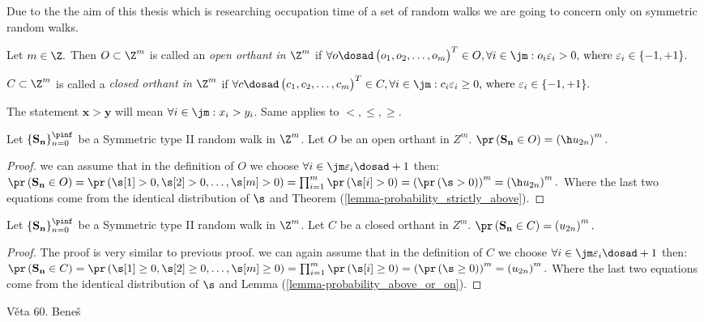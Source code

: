 \begin{rem}
  Due to the the aim of this thesis which is researching occupation time of a set of random walks we are going to concern only on symmetric random walks.
\end{rem}
\begin{defn}[Orthant]
  Let $m \in \Z.$ Then $O\subset \Z^m$ is called an \emph{open orthant in $\Z^m$} if $\forall o\dosad \begin{pmatrix}
  o_1, o_2, \ldots, o_m
  \end{pmatrix}^T \in O, \forall i \in \jm:o_i\varepsilon_i>0 \text{, where } \varepsilon_i\in \{-1,+1\}.$

  $C\subset \Z^m$ is called a \emph{closed orthant in $\Z^m$} if $\forall c\dosad \begin{pmatrix}
  c_1, c_2, \ldots, c_m
\end{pmatrix}^T \in C, \forall i \in \jm:c_i\varepsilon_i\geq 0 \text{, where } \varepsilon_i\in \{-1,+1\}.$
\end{defn}
\begin{rem}
  The statement $\mathbf{x}>\mathbf{y}$ will mean $\forall i \in \jm:x_i>y_i$. Same applies to $<,\leq, \geq.$
\end{rem}
\begin{thm}\label{thm-prob_being_open_orthant}
  Let $\{\mathbf{\mathbf{S_n}}\}_{n=0}^\pinf$ be a Symmetric type II random walk in $\Z^m$. Let $O$ be an open orthant in $Z^m$. $\pr \left(\mathbf{S_n}\in O\right)=\left( \h u_{2n}\right)^m.$
\end{thm}
\begin{proof}
  \Wlog we can assume that in the definition of $O$ we choose $\forall i \in \jm \varepsilon_i \dosad +1$ then:
  $\pr \left(\mathbf{S_n}\in O\right)
  =\pr \left(\s[1]>0, \s[2]>0, \ldots, \s[m]>0\right)
  =\prod_{i=1}^m \pr \left(\s[i]>0\right)
  =\left(\pr \left( \s>0\right)\right)^m
  =\left(\h u_{2n}\right)^m.$
  Where the last two equations come from the identical distribution of $\s$ and Theorem (\ref{lemma-probability_strictly_above}).
\end{proof}
\begin{thm}\label{thm-prob_being_closed_orthant}
  Let $\{\mathbf{\mathbf{S_n}}\}_{n=0}^\pinf$ be a Symmetric type II random walk in $\Z^m$. Let $C$ be a closed orthant in $Z^m$. $\pr \left(\mathbf{S_n}\in C\right)=\left(u_{2n}\right)^m.$
\end{thm}
\begin{proof}
  The proof is very similar to previous proof.
  \Wlog we can again assume that in the definition of $C$ we choose $\forall i \in \jm \varepsilon_i \dosad +1$ then:
  $\pr \left(\mathbf{S_n}\in C\right)
  =\pr \left(\s[1]\geq0, \s[2]\geq0, \ldots, \s[m]\geq0\right)
  =\prod_{i=1}^m \pr \left(\s[i]\geq 0\right)
  =\left(\pr \left( \s\geq0\right)\right)^m
  =\left(u_{2n}\right)^m.$
  Where the last two equations come from the identical distribution of $\s$ and Lemma (\ref{lemma-probability_above_or_on}).
\end{proof}













\begin{thm}
  Věta 60. Beneš
\end{thm}
